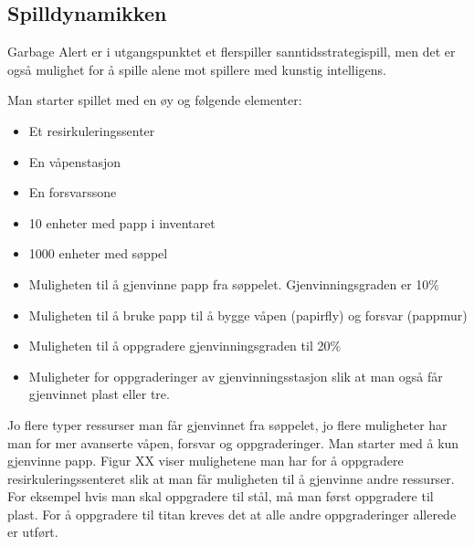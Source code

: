 \subsection{Spilldynamikken}

Garbage Alert er i utgangspunktet et flerspiller sanntidsstrategispill, men det er også mulighet for å spille alene mot spillere med kunstig intelligens. 

Man starter spillet med en øy og følgende elementer:

\begin{itemize}
	\item Et resirkuleringssenter
	\item En våpenstasjon
	\item En forsvarssone
	\item 10 enheter med papp i inventaret
	\item 1000 enheter med søppel
	\item Muligheten til å gjenvinne papp fra søppelet. Gjenvinningsgraden er 10\%
	\item Muligheten til å bruke papp til å bygge våpen (papirfly) og forsvar (pappmur)
	\item Muligheten til å oppgradere gjenvinningsgraden til 20\%
	\item Muligheter for oppgraderinger av gjenvinningsstasjon slik at man også får gjenvinnet plast eller tre.
\end{itemize}

Jo flere typer ressurser man får gjenvinnet fra søppelet, jo flere muligheter har man for mer avanserte våpen, forsvar og oppgraderinger. Man starter med å kun gjenvinne papp. Figur XX viser mulighetene man har for å oppgradere resirkuleringssenteret slik at man får muligheten til å gjenvinne andre ressurser. For eksempel hvis man skal oppgradere til stål, må man først oppgradere til plast. For å oppgradere til titan kreves det at alle andre oppgraderinger allerede er utført. \\

